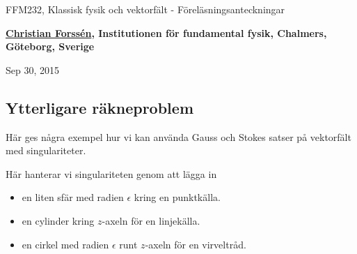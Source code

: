 \documentclass[%
oneside,                 %
final,                   %
10pt]{article}
\begin{document}






\thispagestyle{empty}

\begin{center}
{\LARGE\bf
\begin{spacing}{1.25}
FFM232, Klassisk fysik och vektorfält - Föreläsningsanteckningar
\end{spacing}
}
\end{center}


\begin{center}
{\bf \href{{http://fy.chalmers.se/subatom/nt/}}{Christian Forssén}, Institutionen för fundamental fysik, Chalmers, Göteborg, Sverige${}^{}$} \\ [0mm]
\end{center}

\begin{center}
\end{center}
    

\begin{center}
Sep 30, 2015
\end{center}

\vspace{1cm}


\subsection*{Ytterligare räkneproblem}

Här ges några exempel hur vi kan använda Gauss och Stokes satser på vektorfält med singulariteter. 

Här hanterar vi singulariteten genom att lägga in 
\begin{itemize}
\item en liten sfär med radien $\epsilon$ kring en punktkälla.

\item en cylinder kring $z$-axeln för en linjekälla.

\item en cirkel med radien $\epsilon$ runt $z$-axeln för en virveltråd.
\end{itemize}
\end{document}
